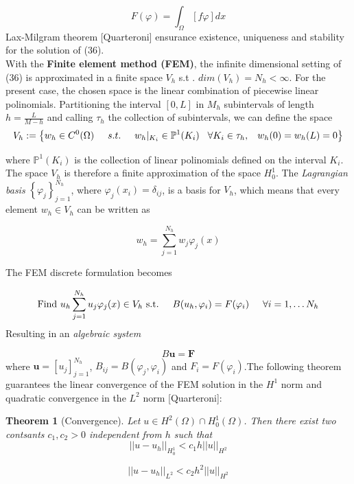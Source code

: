 \documentclass[a4paper]{article}
\newtheorem{theorem}{Theorem}[section]
\begin{document}
\begin{enumerate}
	\begin{equation}
	F(\varphi) = \int_{\Omega} \left[f \varphi\right] dx
	\end{equation}
	Lax-Milgram theorem [Quarteroni] ensurance existence, uniqueness and stability for the solution of (36).\\
	With the \textbf{Finite element method (FEM)}, the infinite dimensional setting of (36) is approximated in a finite space $V_h$ s.t . $dim(V_h) = N_h < \infty$. For the present case, the chosen space is the linear combination of piecewise linear polinomials. Partitioning the interval $[0,L]$ in $M_h$ subintervals of length $ h = \frac{L}{M-h}$ and calling $\tau_h$ the collection of subintervals, we can define the space
	$$ V_h := \left\{ w_h\in C^0(\Omega) \hspace{0.5 cm} s.t. \hspace{0.5 cm} w_h|_{K_i} \in \mathbb{P}^1(K_i) \hspace{0.3 cm} \forall K_i \in \tau_h, \hspace{0.3 cm} w_h(0)=w_h(L)=0 \right\}$$
	
	where $ \mathbb{P}^1(K_i)$ is the collection of linear polinomials defined on the interval $K_i$. The space $V_h$ is therefore a finite approximation of the space $H_0^1$. The \textit{Lagrangian basis} $ \left\{ \varphi _j \right\}_{j=1}^{N_h}$, where $ \varphi_j(x_i) = \delta_{ij}$, is a basis for $V_h$, which means that every element $w_h \in V_h$ can be written as
	
	\begin{equation}
	w_h = \sum_{j=1}^{N_h} w_j \varphi_j(x)
	\end{equation}
	
	The FEM discrete formulation becomes
	
	\begin{equation}
	\text{Find $u_h \sum_{j=1}^{N_h} u_j \varphi_j(x) \in V_h$ s.t.} \hspace{0.5cm} B(u_h,\varphi_i) = F(\varphi_i) \hspace{0.5cm} \forall i = 1, \dots N_h
	\end{equation}
	Resulting in an \textit{algebraic system}
	
	\begin{equation}
	B \textbf{u} = \textbf{F}
	\end{equation}
	where $\textbf{u} = [u_j]_{j=1}^{N_h}$, $B_{ij} = B(\varphi_j,\varphi_i)$ and $F_i = F(\varphi_i)$.The following theorem guarantees the linear convergence of the FEM solution in the $H^1$ norm and quadratic convergence in the $L^2$ norm [Quarteroni]:
	\begin{theorem}[Convergence]
		Let $u \in H^2(\Omega) \cap H_0^1(\Omega)$. Then there exist two contsants $c_1,c_2 >0$ independent from $h$ such that
		$$||u-u_h||_{H_0^1} < c_1h||u||_{H^2}$$
		
		$$||u-u_h||_{L^2} < c_2h^2||u||_{H^2}$$
	\end{theorem}
\end{enumerate}
\end{document}
